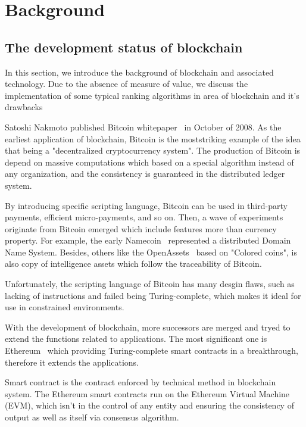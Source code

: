 
\section{Background}

\subsection{The development status of blockchain}
In this section, we introduce the background of blockchain and associated technology. Due to the absence of measure of value, we discuss the implementation of some typical ranking algorithms in area of blockchain and it's drawbacks

Satoshi Nakmoto published Bitcoin whitepaper~\cite{Nakamoto2008} in October of 2008. As the earliest application of blockchain, Bitcoin is the moststriking example of the idea that being a "decentralized cryptocurrency system". The production of Bitcoin is depend on massive computations which based on a special algorithm instead of any organization, and the consistency is guaranteed in the distributed ledger system.

By introducing specific scripting language, Bitcoin can be used in third-party payments, efficient micro-payments, and so on. Then, a wave of experiments originate from Bitcoin emerged which include features more than currency property. For example, the early Namecoin~\cite{Namecoin} represented a distributed Domain Name System. Besides, others like the OpenAssets~\cite{OpenAssets} based on "Colored coins", is  also copy of intelligence assets which follow the traceability of Bitcoin.

Unfortunately, the scripting language of Bitcoin has many desgin flaws, such as lacking of instructions and failed being Turing-complete, which makes it ideal for use in constrained environments.

With the development of blockchain, more successors are merged and tryed to extend the functions related to applications. The most significant one is Ethereum~\cite{buterin2013ethereum} which providing Turing-complete smart contracts in a breakthrough, therefore it extends the applications.

Smart contract is the contract enforced by technical method in blockchain system. The Ethereum smart contracts run on the Ethereum Virtual Machine (EVM), which isn't in the control of any entity and ensuring the consistency of output as well as itself via consensus algorithm.

